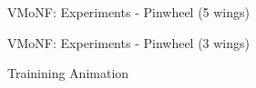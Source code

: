 \documentclass[12pt,ignorenonframetext,]{beamer}
\begin{document}
\begin{frame}{VMoNF: Experiments - Pinwheel (5 wings)}
\protect\hypertarget{vmonf-experiments---pinwheel-5-wings}{}

\centering
{}
\hfill
{}

\end{frame}

\begin{frame}{VMoNF: Experiments - Pinwheel (3 wings)}
\protect\hypertarget{vmonf-experiments---pinwheel-3-wings}{}

Trainining Animation

\end{frame}
\end{document}
